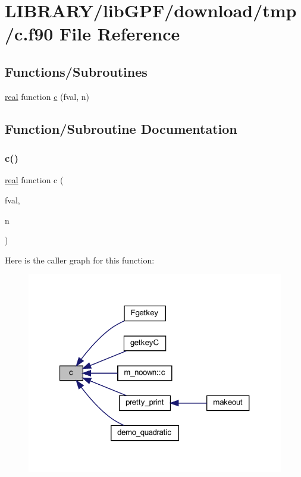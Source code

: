 \hypertarget{c_8f90}{}\section{L\+I\+B\+R\+A\+R\+Y/lib\+G\+P\+F/download/tmp/c.f90 File Reference}
\label{c_8f90}
\subsection*{Functions/\+Subroutines}
\begin{DoxyCompactItemize}
\item 
\hyperlink{read__watch_83_8txt_abdb62bde002f38ef75f810d3a905a823}{real} function \hyperlink{c_8f90_aeb1f4e639be0213b4cbd07f2583a5b1f}{c} (fval, n)
\end{DoxyCompactItemize}


\subsection{Function/\+Subroutine Documentation}
\mbox{\label{c_8f90_aeb1f4e639be0213b4cbd07f2583a5b1f}} 
\subsubsection{\texorpdfstring{c()}{c()}}
{\footnotesize\ttfamily \hyperlink{read__watch_83_8txt_abdb62bde002f38ef75f810d3a905a823}{real} function c (\begin{DoxyParamCaption}\item[{}]{fval,  }\item[{}]{n }\end{DoxyParamCaption})}

Here is the caller graph for this function\+:
\nopagebreak
\begin{figure}[H]
\begin{center}
\leavevmode
\includegraphics[width=321pt]{c_8f90_aeb1f4e639be0213b4cbd07f2583a5b1f_icgraph}
\end{center}
\end{figure}
